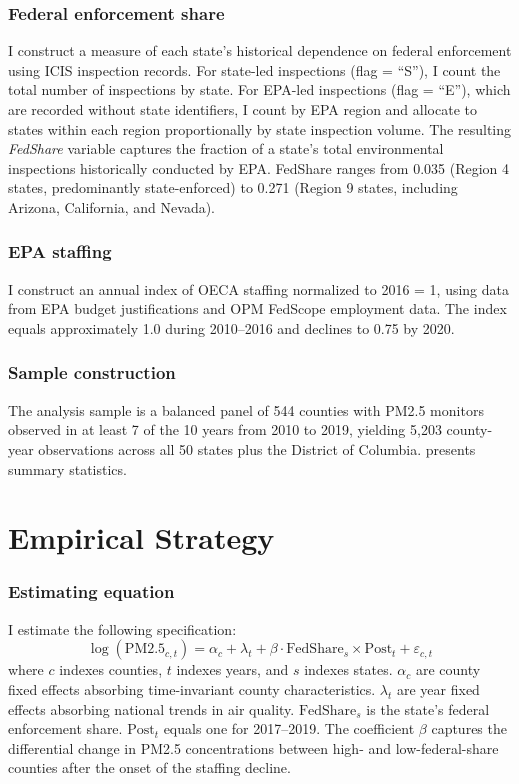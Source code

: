 \documentclass[12pt]{article}
\begin{document}
\subsubsection*{Federal enforcement share} I construct a measure of each state's historical dependence on federal enforcement using ICIS inspection records. For state-led inspections (flag = ``S''), I count the total number of inspections by state. For EPA-led inspections (flag = ``E''), which are recorded without state identifiers, I count by EPA region and allocate to states within each region proportionally by state inspection volume. The resulting \textit{FedShare} variable captures the fraction of a state's total environmental inspections historically conducted by EPA. FedShare ranges from 0.035 (Region 4 states, predominantly state-enforced) to 0.271 (Region 9 states, including Arizona, California, and Nevada).

\subsubsection*{EPA staffing} I construct an annual index of OECA staffing normalized to 2016 = 1, using data from EPA budget justifications and OPM FedScope employment data. The index equals approximately 1.0 during 2010--2016 and declines to 0.75 by 2020.

\subsubsection*{Sample construction} The analysis sample is a balanced panel of 544 counties with PM2.5 monitors observed in at least 7 of the 10 years from 2010 to 2019, yielding 5,203 county-year observations across all 50 states plus the District of Columbia.  presents summary statistics.



\section{Empirical Strategy}\label{sec:empirical}

\subsubsection*{Estimating equation} I estimate the following specification:
\begin{equation}\label{eq:main}
\log(\text{PM2.5}_{c,t}) = \alpha_c + \lambda_t + \beta \cdot \text{FedShare}_s \times \text{Post}_t + \varepsilon_{c,t}
\end{equation}
where $c$ indexes counties, $t$ indexes years, and $s$ indexes states. $\alpha_c$ are county fixed effects absorbing time-invariant county characteristics. $\lambda_t$ are year fixed effects absorbing national trends in air quality. $\text{FedShare}_s$ is the state's federal enforcement share. $\text{Post}_t$ equals one for 2017--2019. The coefficient $\beta$ captures the differential change in PM2.5 concentrations between high- and low-federal-share counties after the onset of the staffing decline.
\end{document}
